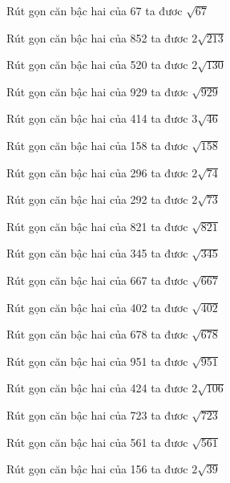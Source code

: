 \documentclass[12pt,a4paper]{article}
\begin{document}
\begin{ex}
Rút gọn căn bậc hai của 67 ta đươc $\sqrt{67}$
\end{ex}
\begin{ex}
Rút gọn căn bậc hai của 852 ta đươc $2\sqrt{213}$
\end{ex}
\begin{ex}
Rút gọn căn bậc hai của 520 ta đươc $2\sqrt{130}$
\end{ex}
\begin{ex}
Rút gọn căn bậc hai của 929 ta đươc $\sqrt{929}$
\end{ex}
\begin{ex}
Rút gọn căn bậc hai của 414 ta đươc $3\sqrt{46}$
\end{ex}
\begin{ex}
Rút gọn căn bậc hai của 158 ta đươc $\sqrt{158}$
\end{ex}
\begin{ex}
Rút gọn căn bậc hai của 296 ta đươc $2\sqrt{74}$
\end{ex}
\begin{ex}
Rút gọn căn bậc hai của 292 ta đươc $2\sqrt{73}$
\end{ex}
\begin{ex}
Rút gọn căn bậc hai của 821 ta đươc $\sqrt{821}$
\end{ex}
\begin{ex}
Rút gọn căn bậc hai của 345 ta đươc $\sqrt{345}$
\end{ex}
\begin{ex}
Rút gọn căn bậc hai của 667 ta đươc $\sqrt{667}$
\end{ex}
\begin{ex}
Rút gọn căn bậc hai của 402 ta đươc $\sqrt{402}$
\end{ex}
\begin{ex}
Rút gọn căn bậc hai của 678 ta đươc $\sqrt{678}$
\end{ex}
\begin{ex}
Rút gọn căn bậc hai của 951 ta đươc $\sqrt{951}$
\end{ex}
\begin{ex}
Rút gọn căn bậc hai của 424 ta đươc $2\sqrt{106}$
\end{ex}
\begin{ex}
Rút gọn căn bậc hai của 723 ta đươc $\sqrt{723}$
\end{ex}
\begin{ex}
Rút gọn căn bậc hai của 561 ta đươc $\sqrt{561}$
\end{ex}
\begin{ex}
Rút gọn căn bậc hai của 156 ta đươc $2\sqrt{39}$
\end{ex}
\end{document}

